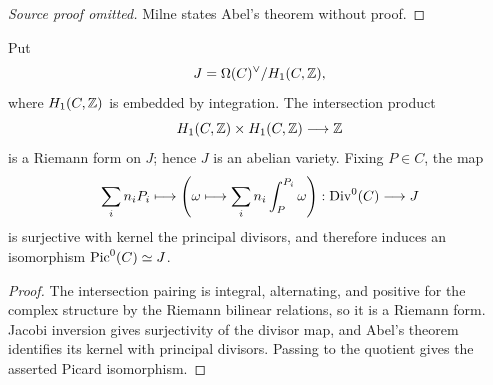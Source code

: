 \begin{proof}[Source proof omitted]
Milne states Abel's theorem without proof.
\end{proof}
\begin{theorem}\label{thm:milne-period-jacobian}
Put
\[
J=\Omega(C)^\vee/H_1(C,\mathbb{Z}),
\]
where $H_1(C,\mathbb{Z})$ is embedded by integration.  The intersection product
\[
H_1(C,\mathbb{Z})\times H_1(C,\mathbb{Z})\longrightarrow\mathbb{Z}
\]
is a Riemann form on $J$; hence $J$ is an abelian variety.  Fixing $P\in C$,
the map
\[
\sum_i n_iP_i\longmapsto\left(\omega\longmapsto
\sum_i n_i\int_P^{P_i}\omega\right):\operatorname{Div}^0(C)\longrightarrow J
\]
is surjective with kernel the principal divisors, and therefore induces an
isomorphism $\operatorname{Pic}^0(C)\simeq J$.
\end{theorem}
\begin{proof}
The intersection pairing is integral, alternating, and positive for the
complex structure by the Riemann bilinear relations, so it is a Riemann form.
Jacobi inversion gives surjectivity of the divisor map, and Abel's theorem
identifies its kernel with principal divisors.  Passing to the quotient gives
the asserted Picard isomorphism.
\end{proof}
